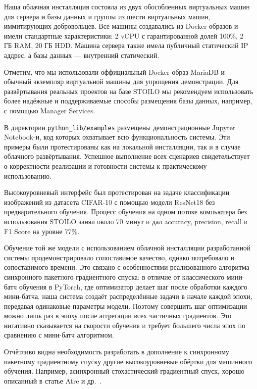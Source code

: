 \documentclass[a4paper,12pt]{extarticle}
\begin{document}
Наша облачная инсталляция состояла из двух обособленных виртуальных машин для сервера и базы данных и группы из шести виртуальных машин, иммитирующих добровольцев. Все машины создавались из Docker-образов и имели стандартные характеристики: 2 vCPU с гарантированной долей 100\%, 2 ГБ RAM, 20 ГБ HDD. Машина сервера также имела публичный статический IP аддрес, а базы данных — внутренний статический.

Отметим, что мы использовали оффициальный Docker-образ MariaDB и обычный экземпляр виртуальной машины для упрощения демонстрации. Для развёртывания реальных проектов на базе STOILO мы рекомендуем использовать более надёжные и поддерживаемые способы размещения базы данных, например, с помощью Manager Services.

В директории \texttt{python\_lib/examples} размещены демонстрационные Jupyter Notebook-и, код которых охватывает всю функциональность системы. Эти примеры были протестированы как на локальной инсталляции, так и в случае облачного развёртывания. Успешное выполнение всех сценариев свидетельствует о корректности реализации и готовности системы к практическому использованию.

Высокоуровневый интерфейс был протестирован на задаче классификации изображений из датасета CIFAR-10 с помощью модели ResNet18 без предварительного обучения.
Процесс обучения на одном потоке компьютера без использования STOILO занял около 70 минут и дал accuracy, precision, recall и F1 Score на уровне $77\%$.

Обучение той же модели с использованием облачной инсталляции разработанной системы продемонстрировало сопоставимое качество, однако потребовало и сопоставимого времени. Это связано с особенностями реализованного алгоритма синхронного пакетного градиентного спуска: в отличие от классического мини-батч обучения в PyTorch, где оптимизатор делает шаг после обработки каждого мини-батча, наша система создаёт распределённые задачи в начале каждой эпохи, передавая одинаковые параметры модели. Поэтому совершить шаг оптимизации можно лишь раз в эпоху после аггрегации всех частичных градиентов. Это нигативно сказывается на скорости обучения и требует большего числа эпох по сравнению с мини-батч алгоритмом.

Отчётливо видна необходимость разработать в дополнение к синхронному пакетному градиентному спуску другие высокоуровневые обёртки для машинного обучения. Например, асинхронный стохастический градиентный спуск, хорошо описанный в статье Atre и др.~\cite{atre2021distributed}.
\end{document}
